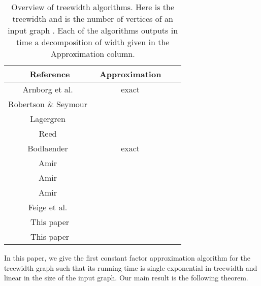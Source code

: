 \documentclass[a4paper,11pt]{article}
\theoremstyle{definition}
\theoremstyle{remark}
\begin{document}
\begin{savenotes}
\begin{table}[htdp]
  \begin{center}
    \begin{tabular}{|c|c|c|c|}
      \hline
      Reference                                 & Approximation   &   &   \\ \hline
      Arnborg  et al.~\cite{ArnborgCP87}        & exact         &  &  \\
      Robertson \& Seymour~\cite{RobertsonS13}  &       &    & \\
      Lagergren~\cite{Lagergren96}              &       &  & \\
      Reed~\cite{Reed92}                        & \footnotemark & &  \\
      Bodlaender~\cite{Bodlaender96}            & exact      & & \\
      Amir~\cite{Amir10}                        &         &  &  \\
      Amir~\cite{Amir10}                        &     &  &  \\
      Amir~\cite{Amir10}                        &  &  &  \\
      Feige et al.~\cite{FeigeHL08}             &  &   &  \\
      This paper                                &       &   &  \\
      This paper                                &       &   &  \\
      \hline
    \end{tabular}
  \end{center}
  \caption{Overview of treewidth  algorithms.  Here  is the treewidth
    and  is the number of vertices of an input graph .
    Each of the algorithms outputs in time  a
    decomposition of width given in the Approximation column.}
  \label{table:tw_history}
\end{table}
\end{savenotes}



In this paper, we give the first constant factor approximation
algorithm for the treewidth graph such that its running time is single
exponential in treewidth and linear in the size of the input
graph. Our main result is the following theorem.
\end{document}

